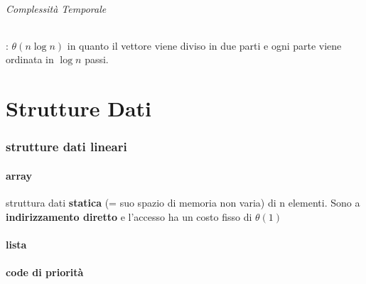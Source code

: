 \documentclass{article}
\begin{document}
\paragraph{Complessità Temporale}: $\theta(n \log n)$ in quanto il vettore viene diviso in due parti e
ogni parte viene ordinata in $\log n$ passi.


\newpage
\part{Strutture Dati}
\section{strutture dati lineari} %
\subsection{array} %
struttura dati \textbf{statica} (= suo spazio di memoria non varia) di n elementi. 
Sono a \textbf{indirizzamento diretto} e l'accesso ha un costo fisso di $\theta (1)$

\subsection{lista} %

\subsection{code di priorità} %
\end{document}
